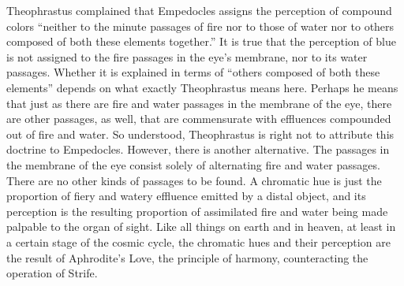 Theophrastus complained that Empedocles assigns the perception of compound colors ``neither to the minute passages of fire nor to those of water nor to others composed of both these elements together.'' It is true that the perception of blue is not assigned to the fire passages in the eye's membrane, nor to its water passages. Whether it is explained in terms of ``others composed of both these elements'' depends on what exactly Theophrastus means here. Perhaps he means that just as there are fire and water passages in the membrane of the eye, there are other passages, as well, that are commensurate with effluences compounded out of fire and water. So understood, Theophrastus is right not to attribute this doctrine to Empedocles. However, there is another alternative. The passages in the membrane of the eye consist solely of alternating fire and water passages. There are no other kinds of passages to be found. A chromatic hue is just the proportion of fiery and watery effluence emitted by a distal object, and its perception is the resulting proportion of assimilated fire and water being made palpable to the organ of sight. Like all things on earth and in heaven, at least in a certain stage of the cosmic cycle, the chromatic hues and their perception are the result of Aphrodite's Love, the principle of harmony, counteracting the operation of Strife.


